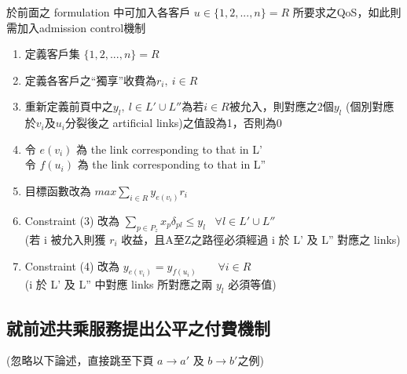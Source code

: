 \documentclass{article}
\begin{document}
於前面之 formulation 中可加入各客戶 \(u \in \{1,2,...,n\} = R\) 所要求之QoS，如此則需加入admission control機制

\begin{enumerate}
\def\labelenumi{\arabic{enumi}.}
  \item 定義客戶集 $\{1,2,...,n\} = R$
  \item 定義各客戶之“獨享”收費為$r_i,\ i \in R$
  \item 重新定義前頁中之$y_l,\ l \in L' \cup L''$為若$i \in R$被允入，則對應之2個$y_l$ (個別對應於$v_i$及$u_i$分裂後之 artificial links)之值設為1，否則為0
  \item 令 $e(v_i)$ 為 the link corresponding to that in L' \\
        令 $f(u_i)$ 為 the link corresponding to that in L''
  \item 目標函數改為 $max \sum\limits_{i \in R} y_{e(v_i)} r_i$
  \item Constraint (3) 改為 $\sum_{p \in P_z} x_p \delta_{pl} \leq y_l \hspace{10pt} \forall l \in L' \cup L''$ \\
        (若 i 被允入則獲 $r_i$ 收益，且A至Z之路徑必須經過 i 於 L' 及 L'' 對應之 links)
  \item Constraint (4) 改為 $y_{e(v_i)} = y_{f(u_i)} \hspace{23pt} \forall i \in R$ \\
        (i 於 L' 及 L'' 中對應 links 所對應之兩 $y_l$ 必須等值)
\end{enumerate}

\newpage
\subsection*{就前述共乘服務提出公平之付費機制}
(忽略以下論述，直接跳至下頁 $a \rightarrow a'$ 及 $b \rightarrow b' 之例$)
\end{document}
